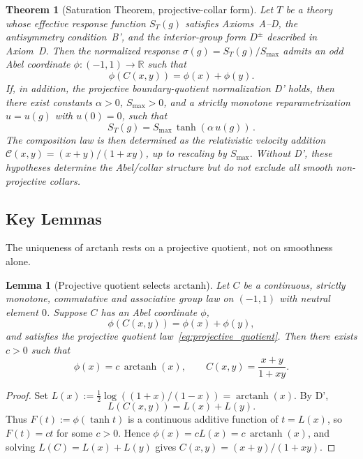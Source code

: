 \documentclass[aps,prd,twocolumn,superscriptaddress,nofootinbib]{revtex4-2}
\newtheorem{theorem}{Theorem}
\newtheorem{lemma}{Lemma}
\begin{document}
\begin{theorem}[Saturation Theorem, projective-collar form]
\label{thm:saturation}
Let $T$ be a theory whose effective response function $S_T(g)$ satisfies Axioms~A--D, the antisymmetry condition~B', and the interior-group form $D^\pm$ described in Axiom~D. Then the normalized response $\sigma(g)=S_T(g)/S_{\max}$ admits an odd Abel coordinate $\phi:(-1,1)\to\mathbb{R}$ such that
\[
  \phi(C(x,y))=\phi(x)+\phi(y).
\]
If, in addition, the projective boundary-quotient normalization D' holds, then there exist constants $\alpha > 0$, $S_{\max} > 0$, and a strictly monotone reparametrization $u = u(g)$ with $u(0) = 0$, such that
\begin{equation}
S_T(g) = S_{\max}\,\tanh\!\left(\alpha\,u(g)\right)\,.
\label{eq:saturation_form}
\end{equation}
The composition law is then determined as the relativistic velocity addition $\mathcal{C}(x,y) = (x+y)/(1+xy)$, up to rescaling by $S_{\max}$. Without D', these hypotheses determine the Abel/collar structure but do not exclude all smooth non-projective collars.
\end{theorem}

\subsection{Key Lemmas}

The uniqueness of $\mathrm{arctanh}$ rests on a projective quotient, not on smoothness alone.

\begin{lemma}[Projective quotient selects $\mathrm{arctanh}$]\label{lem:projective_arctanh}
Let $C$ be a continuous, strictly monotone, commutative and associative group law on $(-1,1)$ with neutral element $0$. Suppose $C$ has an Abel coordinate $\phi$,
\[
  \phi(C(x,y))=\phi(x)+\phi(y),
\]
and satisfies the projective quotient law~\eqref{eq:projective_quotient}. Then there exists $c>0$ such that
\[
  \phi(x)=c\,\operatorname{arctanh}(x),
  \qquad
  C(x,y)=\frac{x+y}{1+xy}.
\]
\end{lemma}

\begin{proof}
Set $L(x):=\frac12\log((1+x)/(1-x))=\operatorname{arctanh}(x)$. By D',
\[
  L(C(x,y))=L(x)+L(y).
\]
Thus $F(t):=\phi(\tanh t)$ is a continuous additive function of $t=L(x)$, so $F(t)=ct$ for some $c>0$. Hence $\phi(x)=cL(x)=c\,\operatorname{arctanh}(x)$, and solving $L(C)=L(x)+L(y)$ gives $C(x,y)=(x+y)/(1+xy)$.
\end{proof}
\end{document}
